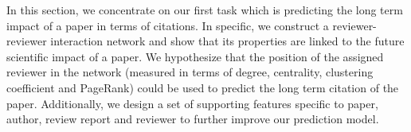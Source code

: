 In this section, we concentrate on our first task which is predicting the long term impact of a paper in terms of citations. 
In specific, we construct a reviewer-reviewer interaction network and show that its properties are linked to the future scientific impact of a paper.  
We hypothesize that the position of the assigned reviewer in the network (measured in terms of degree, centrality, clustering coefficient and PageRank) 
could be used to predict the long term citation of the paper. Additionally, we design a set of supporting features specific to paper, author, review report and reviewer to 
further improve our prediction model. 
























%




